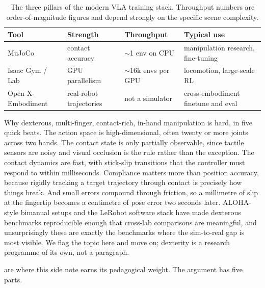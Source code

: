 \begin{table}[ht]
\centering
\begin{tabular}{p{}p{}p{}p{}}
    \toprule
    \textbf{Tool} & \textbf{Strength} & \textbf{Throughput} & \textbf{Typical use} \\
    \midrule
    MuJoCo & contact accuracy & $\sim$1 env on CPU & manipulation research, fine-tuning \\
    Isaac Gym / Lab & GPU parallelism & $\sim$16k envs per GPU & locomotion, large-scale RL \\
    Open X-Embodiment & real-robot trajectories & not a simulator & cross-embodiment finetune and eval \\
    \bottomrule
\end{tabular}
\vspace{2em}
\caption{The three pillars of the modern VLA training stack. Throughput numbers are order-of-magnitude figures and depend strongly on the specific scene complexity.}
\label{tab:vla_simulators}
\end{table}

\vspace{1.5em}

 Why dexterous, multi-finger, contact-rich, in-hand manipulation is hard, in five quick beats. The action space is high-dimensional, often twenty or more joints across two hands. The contact state is only partially observable, since tactile sensors are noisy and visual occlusion is the rule rather than the exception. The contact dynamics are fast, with stick-slip transitions that the controller must respond to within milliseconds. Compliance matters more than position accuracy, because rigidly tracking a target trajectory through contact is precisely how things break. And small errors compound through friction, so a millimetre of slip at the fingertip becomes a centimetre of pose error two seconds later. ALOHA-style bimanual setups and the LeRobot software stack have made dexterous benchmarks reproducible enough that cross-lab comparisons are meaningful, and unsurprisingly these are exactly the benchmarks where the sim-to-real gap is most visible. We flag the topic here and move on; dexterity is a research programme of its own, not a paragraph.

\vspace{2.5em}

 are where this side note earns its pedagogical weight. The argument has five parts.

